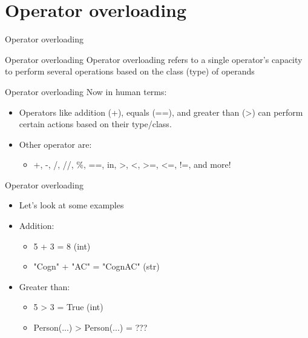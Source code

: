 \section{Operator overloading}

\begin{frame}{Operator overloading}
    \begin{block}{Operator overloading}
        Operator overloading refers to a single operator's capacity to perform several operations based on the class (type) of operands
    \end{block}
\end{frame}

\begin{frame}{Operator overloading}
    Now in human terms:
    \begin{itemize}
        \pause
        \item Operators like addition (+), equals (==), and greater than (>) can perform certain actions based on their type/class.
        \pause
        \item Other operator are:
        \begin{itemize}
            \item +, -, /, //, \%, ==, in, >, <, >=, <=, !=, and more! 
        \end{itemize}
    \end{itemize}
\end{frame}

\begin{frame}{Operator overloading}
\begin{itemize}
    \item Let's look at some examples
    \pause
    \item Addition:
    \begin{itemize}
        \pause
        \item 5 + 3 = 8 (int)
        \pause
        \item "Cogn" + "AC" = "CognAC" (str)
    \end{itemize}
    \pause
    \item Greater than:
    \begin{itemize}
        \pause
        \item 5 > 3 = True (int)
        \pause
        \item Person(...) > Person(...) = ???
    \end{itemize}
\end{itemize}
\end{frame}

